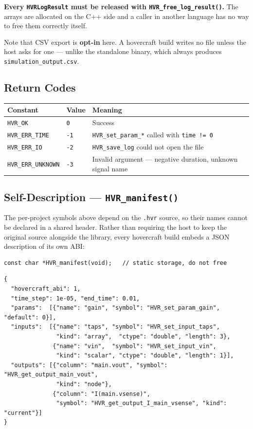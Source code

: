 \documentclass[11pt, a4paper]{article}
\newcommand{\code}[1]{\texttt{\small #1}}
\begin{document}
\textbf{Every \code{HVRLogResult} must be released with
\code{HVR\_free\_log\_result()}.} The arrays are allocated on the C++ side and a
caller in another language has no way to free them correctly itself.

Note that CSV export is \textbf{opt-in} here. A hovercraft build writes no file
unless the host asks for one --- unlike the standalone binary, which always
produces \code{simulation\_output.csv}.

\subsection{Return Codes}

\begin{center}
\begin{tabular}{@{} L{3.6cm} L{1.2cm} L{8.2cm} @{}}
  \toprule
  \textbf{Constant} & \textbf{Value} & \textbf{Meaning} \\
  \midrule
  \code{HVR\_OK}          & \code{0}  & Success \\
  \code{HVR\_ERR\_TIME}   & \code{-1} & \code{HVR\_set\_param\_*} called with \code{time != 0} \\
  \code{HVR\_ERR\_IO}     & \code{-2} & \code{HVR\_save\_log} could not open the file \\
  \code{HVR\_ERR\_UNKNOWN}& \code{-3} & Invalid argument --- negative duration, unknown signal name \\
  \bottomrule
\end{tabular}
\end{center}

\subsection{Self-Description --- \code{HVR\_manifest()}}

The per-project symbols above depend on the \code{.hvr} source, so their names
cannot be declared in a shared header. Rather than requiring the host to keep
the original source alongside the library, every hovercraft build embeds a JSON
description of its own ABI:

\begin{lstlisting}
const char *HVR_manifest(void);   // static storage, do not free
\end{lstlisting}

\begin{lstlisting}
{
  "hovercraft_abi": 1,
  "time_step": 1e-05, "end_time": 0.01,
  "params":  [{"name": "gain", "symbol": "HVR_set_param_gain", "default": 0}],
  "inputs":  [{"name": "taps", "symbol": "HVR_set_input_taps",
               "kind": "array",  "ctype": "double", "length": 3},
              {"name": "vin",  "symbol": "HVR_set_input_vin",
               "kind": "scalar", "ctype": "double", "length": 1}],
  "outputs": [{"column": "main.vout", "symbol": "HVR_get_output_main_vout",
               "kind": "node"},
              {"column": "I(main.vsense)",
               "symbol": "HVR_get_output_I_main_vsense", "kind": "current"}]
}
\end{lstlisting}
\end{document}
